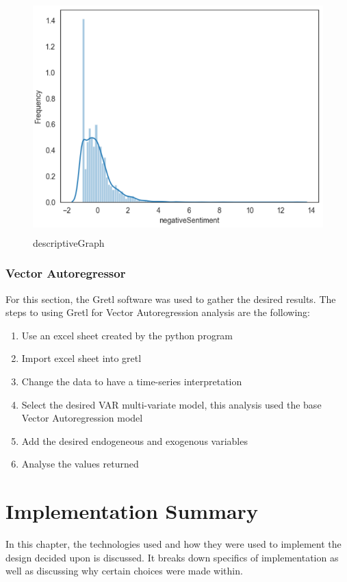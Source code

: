 \begin{figure}[h!]
    \centering
    \includegraphics[width=15cm,height=9cm,keepaspectratio]{implementation/descriptiveGraph.png}
    \caption{descriptiveGraph}
    \label{fig:descriptiveGraph}
\end{figure}

\subsubsection{Vector Autoregressor}

For this section, the Gretl software was used to gather the desired results. The steps to using Gretl for Vector Autoregression analysis are the following:
\begin{enumerate}
    \item Use an excel sheet created by the python program
    \item Import excel sheet into gretl
    \item Change the data to have a time-series interpretation
    \item Select the desired VAR multi-variate model, this analysis used the base Vector Autoregression model
    \item Add the desired endogeneous and exogenous variables
    \item Analyse the values returned
\end{enumerate}

\section{Implementation Summary}

In this chapter, the technologies used and how they were used to implement the design decided upon is discussed. It breaks down specifics of implementation as well as discussing why certain choices were made within.